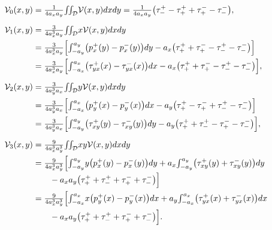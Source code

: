 \begin{align*}
	\mathcal V_{0}(x,y)
	&= \tfrac{1}{4 a_{x} a_{y}}
	{\textstyle\iint_{\mathcal D}}  \mathcal V(x,y) dx dy
	= \tfrac{1}{4 a_{x} a_{y}}
	\bigl(\tau_{-}^{+}-\tau_{+}^{+}+\tau_{+}^{-}-\tau_{-}^{-}\bigr),
	\\[6pt]
	\mathcal V_{1}(x,y)
	&= \tfrac{3}{4 a_{x}^{3} a_{y}}
	{\textstyle\iint_{\mathcal D}}  x \mathcal V(x,y) dx dy
	\\
	&= \tfrac{3}{4 a_{x}^{3} a_{y}}
	\Bigl[
	{\textstyle\int_{-a_{y}}^{a_{y}}} \bigl(p_{x}^{+}(y)-p_{x}^{-}(y)\bigr) dy
	- a_{x}\bigl(\tau_{+}^{+}+\tau_{+}^{-}-\tau_{-}^{+}-\tau_{-}^{-}\bigr)
	\Bigr]
	\\
	&= \tfrac{3}{4 a_{x}^{3} a_{y}}
	\Bigl[
	{\textstyle\int_{-a_{x}}^{a_{x}}} \bigl(\tau_{yx}^{+}(x)-\tau_{yx}^{-}(x)\bigr) dx
	- a_{x}\bigl(\tau_{+}^{+}+\tau_{+}^{-}-\tau_{-}^{+}-\tau_{-}^{-}\bigr)
	\Bigr],
	\\[6pt]
	\mathcal V_{2}(x,y)
	&= \tfrac{3}{4 a_{y}^{3} a_{x}}
	{\textstyle\iint_{\mathcal D}}  y \mathcal V(x,y) dx dy
	\\
	&= \tfrac{3}{4 a_{y}^{3} a_{x}}
	\Bigl[
	{\textstyle\int_{-a_{x}}^{a_{x}}} \bigl(p_{y}^{+}(x)-p_{y}^{-}(x)\bigr) dx
	- a_{y}\bigl(\tau_{+}^{+}-\tau_{+}^{-}+\tau_{-}^{+}-\tau_{-}^{-}\bigr)
	\Bigr]
	\\
	&= \tfrac{3}{4 a_{y}^{3} a_{x}}
	\Bigl[
	{\textstyle\int_{-a_{y}}^{a_{y}}} \bigl(\tau_{xy}^{+}(y)-\tau_{xy}^{-}(y)\bigr) dy
	- a_{y}\bigl(\tau_{+}^{+}+\tau_{-}^{+}-\tau_{+}^{-}-\tau_{-}^{-}\bigr)
	\Bigr],
	\\[6pt]
	\mathcal V_{3}(x,y)
	&= \tfrac{9}{4 a_{x}^{3} a_{y}^{3}}
	{\textstyle\iint_{\mathcal D}}  x y \mathcal V(x,y) dx dy
	\\
	&= \tfrac{9}{4 a_{x}^{3} a_{y}^{3}}
	\Bigl[
	{\textstyle\int_{-a_{y}}^{a_{y}}}  y\bigl(p_{x}^{+}(y)-p_{x}^{-}(y)\bigr) dy
	+ a_{x} {\textstyle\int_{-a_{y}}^{a_{y}}} \bigl(\tau_{xy}^{+}(y)+\tau_{xy}^{-}(y)\bigr) dy
	\\[-2pt]
	&\qquad
	- a_{x} a_{y}\bigl(\tau_{+}^{+}+\tau_{-}^{+}+\tau_{+}^{-}+\tau_{-}^{-}\bigr)
	\Bigr]
	\\
	&= \tfrac{9}{4 a_{x}^{3} a_{y}^{3}}
	\Bigl[
	{\textstyle\int_{-a_{x}}^{a_{x}}}  x\bigl(p_{y}^{+}(x)-p_{y}^{-}(x)\bigr) dx
	+ a_{y} {\textstyle\int_{-a_{x}}^{a_{x}}} \bigl(\tau_{yx}^{+}(x)+\tau_{yx}^{-}(x)\bigr) dx
	\\
	&\qquad
	- a_{x} a_{y}\bigl(\tau_{+}^{+}+\tau_{-}^{+}+\tau_{+}^{-}+\tau_{-}^{-}\bigr)
	\Bigr].
\end{align*}

